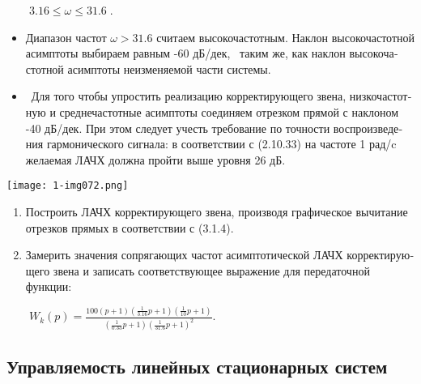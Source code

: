 \documentclass[a4paper]{article}
\newcommand\liststyleWWviiiNumxxxvi{%
\renewcommand\theenumi{\arabic{enumi}}
\renewcommand\theenumii{\arabic{enumii}}
\renewcommand\theenumiii{\arabic{enumiii}}
\renewcommand\labelitemi{}
\renewcommand\labelenumi{\theenumi.}
\renewcommand\labelenumii{\theenumii.}
\renewcommand\labelenumiii{\theenumiii.}
}
\newcommand\liststyleWWviiiNumxlv{%
\renewcommand\theenumi{\arabic{enumi}}
\renewcommand\theenumii{\arabic{enumii}}
\renewcommand\theenumiii{\arabic{enumiii}}
\renewcommand\theenumiv{\arabic{enumiv}}
\renewcommand\labelenumi{\theenumi.}
\renewcommand\labelenumii{\theenumii.}
\renewcommand\labelenumiii{\theenumiii.}
\renewcommand\labelenumiv{\theenumiv.}
}
\begin{document}
{\begin{russian}\sffamily
\ \ \ \  $3.16\le ω\le 31.6\;$.
\end{russian}}


\bigskip

\liststyleWWviiiNumxxxvi
\begin{itemize}
\item {\begin{russian}\sffamily
Диапазон частот  $ω>31.6$ считаем высокочастотным. Наклон высокочастотной асимптоты выбираем равным -60 дБ/дек, \ таким
же, как наклон высокочастотной асимптоты неизменяемой части системы.
\end{russian}}
\item {\begin{russian}\sffamily
\ Для того чтобы упростить реализацию корректирующего звена, низкочастотную и среднечастотные асимптоты соединяем
отрезком прямой с наклоном -40 дБ/дек. При этом следует учесть требование по точности воспроизведения гармонического
сигнала: в соответствии с (2.10.33) на частоте 1 рад/\textenglish{c} желаемая ЛАЧХ должна пройти выше уровня 26 дБ.
\end{russian}}
\end{itemize}
{\centering  \texttt{[image: 1-img072.png]} \par}

\bigskip


\bigskip

\liststyleWWviiiNumxlv
\begin{enumerate}
\item {\begin{russian}\sffamily
Построить ЛАЧХ корректирующего звена, производя графическое вычитание отрезков прямых в соответствии с (3.1.4).
\end{russian}}
\item {\begin{russian}\sffamily
Замерить значения сопрягающих частот асимптотической ЛАЧХ корректирующего звена и записать соответствующее выражение для
передаточной функции:
\end{russian}}
\end{enumerate}
{\begin{russian}\sffamily
\ \ \ \  $W_k(p)=\frac{100(p+1)(\frac 1{3.16}p+1)(\frac 1{10}p+1)}{(\frac 1{0.33}p+1)(\frac 1{31.6}p+1)^2}$.
\end{russian}}


\bigskip

\subsection{Управляемость линейных стационарных систем}
\hypertarget{RefHeadingToc455659732}{}
\bigskip
\end{document}
